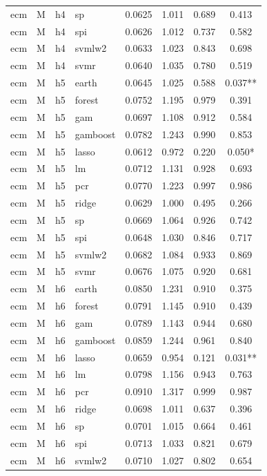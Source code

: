 \begin{ThreePartTable}
\begin{longtable}[t]{llclcccc}
ecm & M & h4 & sp & 0.0625 & 1.011 & 0.689 & 0.413\\
ecm & M & h4 & spi & 0.0626 & 1.012 & 0.737 & 0.582\\
ecm & M & h4 & svmlw2 & 0.0633 & 1.023 & 0.843 & 0.698\\
ecm & M & h4 & svmr & 0.0640 & 1.035 & 0.780 & 0.519\\
\addlinespace
ecm & M & h5 & earth & 0.0645 & 1.025 & 0.588 & 0.037**\\
ecm & M & h5 & forest & 0.0752 & 1.195 & 0.979 & 0.391\\
ecm & M & h5 & gam & 0.0697 & 1.108 & 0.912 & 0.584\\
ecm & M & h5 & gamboost & 0.0782 & 1.243 & 0.990 & 0.853\\
ecm & M & h5 & lasso & 0.0612 & 0.972 & 0.220 & 0.050*\\
ecm & M & h5 & lm & 0.0712 & 1.131 & 0.928 & 0.693\\
ecm & M & h5 & pcr & 0.0770 & 1.223 & 0.997 & 0.986\\
ecm & M & h5 & ridge & 0.0629 & 1.000 & 0.495 & 0.266\\
ecm & M & h5 & sp & 0.0669 & 1.064 & 0.926 & 0.742\\
ecm & M & h5 & spi & 0.0648 & 1.030 & 0.846 & 0.717\\
ecm & M & h5 & svmlw2 & 0.0682 & 1.084 & 0.933 & 0.869\\
ecm & M & h5 & svmr & 0.0676 & 1.075 & 0.920 & 0.681\\
\addlinespace
ecm & M & h6 & earth & 0.0850 & 1.231 & 0.910 & 0.375\\
ecm & M & h6 & forest & 0.0791 & 1.145 & 0.910 & 0.439\\
ecm & M & h6 & gam & 0.0789 & 1.143 & 0.944 & 0.680\\
ecm & M & h6 & gamboost & 0.0859 & 1.244 & 0.961 & 0.840\\
ecm & M & h6 & lasso & 0.0659 & 0.954 & 0.121 & 0.031**\\
ecm & M & h6 & lm & 0.0798 & 1.156 & 0.943 & 0.763\\
ecm & M & h6 & pcr & 0.0910 & 1.317 & 0.999 & 0.987\\
ecm & M & h6 & ridge & 0.0698 & 1.011 & 0.637 & 0.396\\
ecm & M & h6 & sp & 0.0701 & 1.015 & 0.664 & 0.461\\
ecm & M & h6 & spi & 0.0713 & 1.033 & 0.821 & 0.679\\
ecm & M & h6 & svmlw2 & 0.0710 & 1.027 & 0.802 & 0.654\\

\end{longtable}
\end{ThreePartTable}
